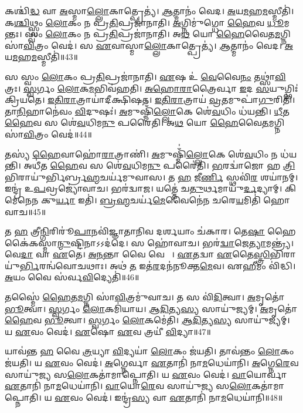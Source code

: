    𑌕𑌶𑍍𑌚𑌿॑\ul{𑌦𑍍𑌧} 𑌵𑌾 \ul{𑌅}𑌸𑍍𑌮𑌾\ul{𑌲𑍍𑌲𑍋}𑌕𑌾𑌤𑍍𑌪𑍍𑌰𑍇𑌤𑍍𑌯॑।
   \ul{𑌆}𑌤𑍍𑌮𑌾𑌨𑌂॑ 𑌵𑍇𑌦।
   \ul{𑌅}𑌯\ul{𑌮}𑌹\ul{𑌮}𑌸𑍍𑌮𑍀𑌤𑌿॑।
   𑌕\ul{𑌶𑍍𑌚𑌿}𑌥𑍍𑌸𑍍𑌵𑌂 \ul{𑌲𑍋}𑌕𑌂 𑌨 𑌪𑍍𑌰\ul{𑌤𑌿}𑌪𑍍𑌰𑌜𑌾॑𑌨𑌾𑌤𑌿।
   \ul{𑌅}𑌗𑍍𑌨𑌿𑌮𑍁॑𑌗𑍍𑌧𑍋 \ul{𑌹𑍈}𑌵 \ul{𑌧𑍂}𑌮𑌤𑌾᳚𑌨𑍍𑌤𑌃।
   𑌸𑍍𑌵𑌂 \ul{𑌲𑍋}𑌕𑌂 𑌨 𑌪𑍍𑌰\ul{𑌤𑌿}𑌪𑍍𑌰𑌜𑌾॑𑌨𑌾𑌤𑌿।
   𑌅\ul{𑌥} 𑌯𑍋 \ul{𑌹𑍈}𑌵𑍈𑌤\ul{𑌮}𑌗𑍍𑌨𑌿 𑌸𑌾॑\ul{𑌵𑌿}𑌤𑍍𑌰𑌂 𑌵𑍇𑌦॑।
   𑌸 \ul{𑌏}𑌵𑌾𑌸𑍍𑌮𑌾\ul{𑌲𑍍𑌲𑍋}𑌕𑌾𑌤𑍍𑌪𑍍𑌰𑍇𑌤𑍍𑌯॑।
   \ul{𑌆}𑌤𑍍𑌮𑌾𑌨𑌂॑ 𑌵𑍇𑌦।
   \ul{𑌅}𑌯\ul{𑌮}𑌹\ul{𑌮}𑌸𑍍𑌮𑍀𑌤𑌿॑॥43॥

   𑌸 𑌸𑍍𑌵𑌂 \ul{𑌲𑍋}𑌕𑌂 𑌪𑍍𑌰\ul{𑌤𑌿}𑌪𑍍𑌰𑌜𑌾॑𑌨𑌾𑌤𑌿।
   \ul{𑌏}𑌷 𑌉॑ \ul{𑌵𑍇}𑌵𑍈\ul{𑌨𑌂} 𑌤𑌥𑍍𑌸𑌾॑\ul{𑌵𑌿}𑌤𑍍𑌰𑌃।
   \ul{𑌸𑍍𑌵}𑌰𑍍𑌗𑌂 \ul{𑌲𑍋}𑌕\ul{𑌮}𑌭𑌿𑌵॑𑌹𑌤𑌿।
   \ul{𑌅}\ul{𑌹𑍋}\ul{𑌰𑌾}𑌤𑍍𑌰𑍈𑌰𑍍𑌵𑌾 \ul{𑌇}𑌦 \ul{𑌸}𑌯𑍁𑌗𑍍𑌭𑌿𑌃॑ 𑌕𑍍𑌰𑌿𑌯𑌤𑍇।
   \ul{𑌇}\ul{𑌤𑌿}\ul{𑌰𑌾}𑌤𑍍𑌰𑌾𑌯𑌾॑𑌦𑍀𑌕𑍍𑌷𑌿𑌷𑌤।
   \ul{𑌇}\ul{𑌤𑌿}\ul{𑌰𑌾}𑌤𑍍𑌰𑌾𑌯॑ \ul{𑌵𑍍𑌰}𑌤𑌮𑍁𑌪𑌾॑\ul{𑌗𑍁}𑌰𑌿𑌤𑌿॑।
   𑌤𑌾\ul{𑌨𑌿}𑌹𑌾𑌨𑍇॑𑌵𑌂 \ul{𑌵𑌿}𑌦𑍁𑌷𑌃॑।
   \ul{𑌅}𑌮𑍁𑌷𑍍𑌮𑌿𑌁॑\ul{𑌲𑍍𑌲𑍋}𑌕𑍇 𑌶𑍇॑\ul{𑌵}𑌧𑌿𑌂 𑌧॑𑌯𑌨𑍍𑌤𑌿।
   \ul{𑌧𑍀}𑌤 \ul{𑌹𑍈}𑌵 𑌸 𑌶𑍇॑\ul{𑌵}𑌧𑌿𑌮\ul{𑌨𑍁} 𑌪𑌰𑍈॑𑌤𑌿।
   𑌅\ul{𑌥} 𑌯𑍋 \ul{𑌹𑍈}𑌵𑍈\ul{𑌤}𑌮𑌗𑍍𑌨𑌿 𑌸𑌾॑\ul{𑌵𑌿}𑌤𑍍𑌰𑌂 𑌵𑍇𑌦॑॥44॥

   𑌤𑌸𑍍𑌯॑ \ul{𑌹𑍈}𑌵𑌾𑌹𑍋॑\ul{𑌰𑌾}𑌤𑍍𑌰𑌾𑌣𑌿॑।
   \ul{𑌅}𑌮𑍁𑌷𑍍𑌮𑌿𑌁॑\ul{𑌲𑍍𑌲𑍋}𑌕𑍇 𑌶𑍇॑\ul{𑌵}𑌧𑌿𑌂 𑌨 𑌧॑𑌯𑌨𑍍𑌤𑌿।
   𑌅𑌧𑍀॑𑌤 \ul{𑌹𑍈}𑌵 𑌸 𑌶𑍇॑\ul{𑌵}𑌧𑌿𑌮\ul{𑌨𑍁} 𑌪𑌰𑍈॑𑌤𑌿।
   \ul{𑌭}𑌰𑌦𑍍𑌵𑌾॑𑌜𑍋 𑌹 \ul{𑌤𑍍𑌰𑌿}𑌭𑌿𑌰𑌾𑌯𑍁॑𑌰𑍍𑌭𑌿𑌰𑍍𑌬𑍍𑌰\ul{𑌹𑍍𑌮}𑌚𑌰𑍍𑌯॑𑌮𑍁𑌵𑌾𑌸।
   𑌤 \ul{𑌹} 𑌜𑍀\ul{𑌰𑍍𑌣𑌿}\ul{} 𑌸𑍍𑌥𑌵𑌿॑\ul{𑌰}\ul{} 𑌶𑌯𑌾॑𑌨𑌮𑍍।
   𑌇𑌨𑍍𑌦𑍍𑌰॑ 𑌉\ul{𑌪}𑌵𑍍𑌰𑌜𑍍𑌯𑍋॑𑌵𑌾𑌚।
   𑌭𑌰॑𑌦𑍍𑌵𑌾𑌜।
   𑌯𑌤𑍍𑌤𑍇॑ 𑌚\ul{𑌤𑍁}𑌰𑍍𑌥𑌮𑌾𑌯𑍁॑\ul{𑌰𑍍𑌦}𑌦𑍍𑌯𑌾𑌮𑍍।
   𑌕𑌿𑌮𑍇॑𑌨𑍇𑌨 𑌕𑍁\ul{𑌰𑍍𑌯𑌾} 𑌇𑌤𑌿॑।
   \ul{𑌬𑍍𑌰}\ul{𑌹𑍍𑌮}𑌚𑌰𑍍𑌯॑\ul{𑌮𑍇}𑌵𑍈𑌨𑍇॑𑌨 𑌚𑌰𑍇\ul{𑌯}𑌮𑌿𑌤𑌿॑ 𑌹𑍋𑌵𑌾𑌚॥45॥

   𑌤 \ul{𑌹} 𑌤𑍍𑌰𑍀\ul{𑌨𑍍𑌗𑌿}𑌰𑌿𑌰𑍂॑\ul{𑌪𑌾}𑌨𑌵𑌿॑𑌜𑍍𑌞𑌾𑌤𑌾𑌨𑌿𑌵 𑌦𑌰𑍍\mbox{}\ul{𑌶}𑌯𑌾𑌂 𑌚॑𑌕𑌾𑌰।
   𑌤𑍇\ul{𑌷𑌾}\ul{} 𑌹𑍈𑌕𑍈॑𑌕𑌸𑍍𑌮𑌾\ul{𑌨𑍍𑌮𑍁}𑌷𑍍𑌟𑌿𑌨𑌾𑌽𑌽𑌦॑𑌦𑍇।
   𑌸 𑌹𑍋॑𑌵𑌾𑌚।
   𑌭𑌰॑\ul{𑌦𑍍𑌵𑌾}𑌜𑍇\ul{𑌤𑍍𑌯𑌾}𑌮𑌨𑍍𑌤𑍍𑌰𑍍𑌯॑।
   𑌵𑍇\ul{𑌦𑌾} 𑌵𑌾 \ul{𑌏}𑌤𑍇।
   \ul{𑌅}\ul{𑌨}𑌨𑍍𑌤𑌾 𑌵𑍈 𑌵𑍇𑌦𑌾𑌃᳚।
   \ul{𑌏}𑌤𑌦𑍍𑌵𑌾 \ul{𑌏}𑌤𑍈\ul{𑌸𑍍𑌤𑍍𑌰𑌿}𑌭𑌿𑌰𑌾𑌯𑍁॑\ul{𑌰𑍍𑌭𑌿}𑌰𑌨𑍍𑌵॑\-𑌵𑍋𑌚𑌥𑌾𑌃।
   𑌅𑌥॑ \ul{𑌤} 𑌇𑌤॑\ul{𑌰}𑌦𑌨॑𑌨𑍂𑌕𑍍𑌤\ul{𑌮𑍇}𑌵।
   𑌏\ul{𑌹𑍀}𑌮𑌂 𑌵𑌿॑𑌦𑍍𑌧𑌿।
   \ul{𑌅}𑌯𑌂 𑌵𑍈 𑌸॑𑌰𑍍𑌵\ul{𑌵𑌿}𑌦𑍍𑌯𑍇𑌤𑌿॑॥46॥

   𑌤𑌸𑍍𑌮𑍈॑ \ul{𑌹𑍈}𑌤\ul{𑌮}𑌗𑍍𑌨𑌿 𑌸𑌾॑\ul{𑌵𑌿}𑌤𑍍𑌰𑌮𑍁॑𑌵𑌾𑌚।
   𑌤 𑌸 𑌵𑌿॑\ul{𑌦𑌿}𑌤𑍍𑌵𑌾।
   \ul{𑌅}𑌮𑍃𑌤𑍋॑ \ul{𑌭𑍂}𑌤𑍍𑌵𑌾।
   \ul{𑌸𑍍𑌵}𑌰𑍍𑌗𑌂 \ul{𑌲𑍋}𑌕𑌮𑌿॑𑌯𑌾𑌯।
   \ul{𑌆}\ul{𑌦𑌿}𑌤𑍍𑌯\ul{𑌸𑍍𑌯} 𑌸𑌾𑌯𑍁॑𑌜𑍍𑌯𑌮𑍍।
   \ul{𑌅}𑌮𑍃𑌤𑍋॑ \ul{𑌹𑍈}𑌵 \ul{𑌭𑍂}𑌤𑍍𑌵𑌾।
   \ul{𑌸𑍍𑌵}𑌰𑍍𑌗𑌂 \ul{𑌲𑍋}𑌕𑌮𑍇॑𑌤𑌿।
   \ul{𑌆}\ul{𑌦𑌿}𑌤𑍍𑌯\ul{𑌸𑍍𑌯} 𑌸𑌾𑌯𑍁॑𑌜𑍍𑌯𑌮𑍍।
   𑌯 \ul{𑌏}𑌵𑌂 𑌵𑍇𑌦॑।
   \ul{𑌏}𑌷𑍋 \ul{𑌏}𑌵 𑌤𑍍𑌰𑌯𑍀॑ \ul{𑌵𑌿}𑌦𑍍𑌯𑌾॥47॥

   𑌯𑌾𑌵॑𑌨𑍍𑌤 \ul{𑌹} 𑌵𑍈 \ul{𑌤𑍍𑌰}𑌯𑍍𑌯𑌾 \ul{𑌵𑌿}𑌦𑍍𑌯𑌯𑌾॑ \ul{𑌲𑍋}𑌕𑌂 𑌜॑𑌯𑌤𑌿।
   𑌤𑌾𑌵॑𑌨𑍍𑌤𑌂 \ul{𑌲𑍋}𑌕𑌂 𑌜॑𑌯𑌤𑌿।
   𑌯 \ul{𑌏}𑌵𑌂 𑌵𑍇𑌦॑।
   \ul{𑌅}𑌗𑍍𑌨𑍇𑌰𑍍𑌵𑌾 \ul{𑌏}𑌤𑌾𑌨𑌿॑ 𑌨𑌾\ul{𑌮}𑌧𑍇𑌯𑌾॑𑌨𑌿।
   \ul{𑌅}𑌗𑍍𑌨𑍇\ul{𑌰𑍇}𑌵 𑌸𑌾𑌯𑍁॑𑌜𑍍𑌯 𑌸\ul{𑌲𑍋}𑌕𑌤𑌾॑𑌮𑌾𑌪𑍍𑌨𑍋𑌤𑌿।
   𑌯 \ul{𑌏}𑌵𑌂 𑌵𑍇𑌦॑।
   \ul{𑌵𑌾}𑌯𑍋𑌰𑍍𑌵𑌾 \ul{𑌏}𑌤𑌾𑌨𑌿॑ 𑌨𑌾\ul{𑌮}𑌧𑍇𑌯𑌾॑𑌨𑌿।
   \ul{𑌵𑌾}𑌯𑍋\ul{𑌰𑍇}𑌵 𑌸𑌾𑌯𑍁॑𑌜𑍍𑌯 𑌸\ul{𑌲𑍋}𑌕𑌤𑌾॑𑌮𑌾𑌪𑍍𑌨𑍋𑌤𑌿।
   𑌯 \ul{𑌏}𑌵𑌂 𑌵𑍇𑌦॑।
   𑌇𑌨𑍍𑌦𑍍𑌰॑\ul{𑌸𑍍𑌯} 𑌵𑌾 \ul{𑌏}𑌤𑌾𑌨𑌿॑ 𑌨𑌾\ul{𑌮}𑌧𑍇𑌯𑌾॑𑌨𑌿॥48॥

